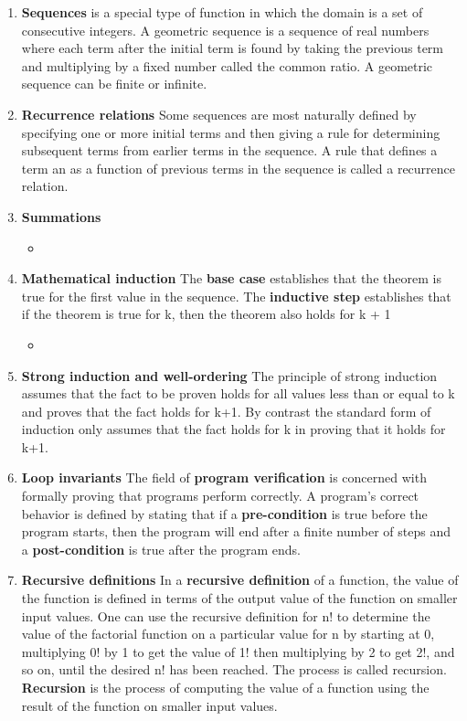 \documentclass[12pt,a4paper]{article}
\begin{document}
\begin{center}
  \large\textsc{}
\end{center}
\begin{enumerate}
  \item \textbf{Sequences} is a special type of function in which the domain is a set of consecutive integers.
  A geometric sequence is a sequence of real numbers where each term after the initial term is found by taking the previous term and multiplying by a fixed number called the common ratio. A geometric sequence can be finite or infinite.
  \item \textbf{Recurrence relations} Some sequences are most naturally defined by specifying one or more initial terms and then giving a rule for determining subsequent terms from earlier terms in the sequence. A rule that defines a term an as a function of previous terms in the sequence is called a recurrence relation.
  \item \textbf{Summations}
  \begin{itemize}
    \item 
  \end{itemize}
  \item \textbf{Mathematical induction} The \textbf{base case} establishes that the theorem is true for the first value in the sequence.
  The \textbf{inductive step} establishes that if the theorem is true for k, then the theorem also holds for k + 1
  \begin{itemize}
    \item 
  \end{itemize}
  \item \textbf{Strong induction and well-ordering} The principle of strong induction assumes that the fact to be proven holds for all values less than or equal to k and proves that the fact holds for k+1. By contrast the standard form of induction only assumes that the fact holds for k in proving that it holds for k+1.
  \item \textbf{Loop invariants} The field of \textbf{program verification} is concerned with formally proving that programs perform correctly. A program's correct behavior is defined by stating that if a \textbf{pre-condition} is true before the program starts, then the program will end after a finite number of steps and a \textbf{post-condition} is true after the program ends.
  \item \textbf{Recursive definitions} In a \textbf{recursive definition} of a function, the value of the function is defined in terms of the output value of the function on smaller input values. One can use the recursive definition for n! to determine the value of the factorial function on a particular value for n by starting at 0, multiplying 0! by 1 to get the value of 1! then multiplying by 2 to get 2!, and so on, until the desired n! has been reached. The process is called recursion. \textbf{Recursion} is the process of computing the value of a function using the result of the function on smaller input values.

\end{enumerate}
\end{document}

